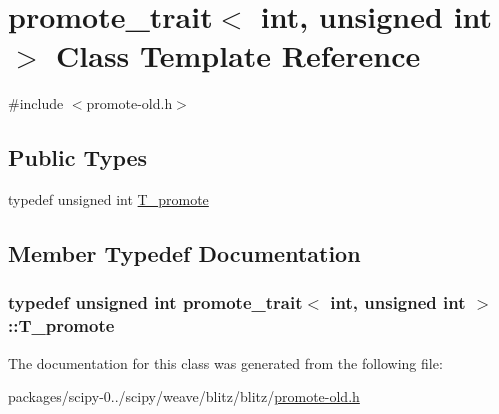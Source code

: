 \hypertarget{classpromote__trait_3_01int_00_01unsigned_01int_01_4}{}\section{promote\+\_\+trait$<$ int, unsigned int $>$ Class Template Reference}
\label{classpromote__trait_3_01int_00_01unsigned_01int_01_4}


{\ttfamily \#include $<$promote-\/old.\+h$>$}

\subsection*{Public Types}
\begin{DoxyCompactItemize}
\item 
typedef unsigned int \hyperlink{classpromote__trait_3_01int_00_01unsigned_01int_01_4_aebe2d795e102cb806fdf79657180f7fa}{T\+\_\+promote}
\end{DoxyCompactItemize}


\subsection{Member Typedef Documentation}
\hypertarget{classpromote__trait_3_01int_00_01unsigned_01int_01_4_aebe2d795e102cb806fdf79657180f7fa}{}
\subsubsection[{T\+\_\+promote}]{\setlength{\rightskip}{0pt plus 5cm}typedef unsigned int {\bf promote\+\_\+trait}$<$ int, unsigned int $>$\+::{\bf T\+\_\+promote}}\label{classpromote__trait_3_01int_00_01unsigned_01int_01_4_aebe2d795e102cb806fdf79657180f7fa}


The documentation for this class was generated from the following file\+:\begin{DoxyCompactItemize}
\item 
packages/scipy-\/0../scipy/weave/blitz/blitz/\hyperlink{promote-old_8h}{promote-\/old.\+h}\end{DoxyCompactItemize}
